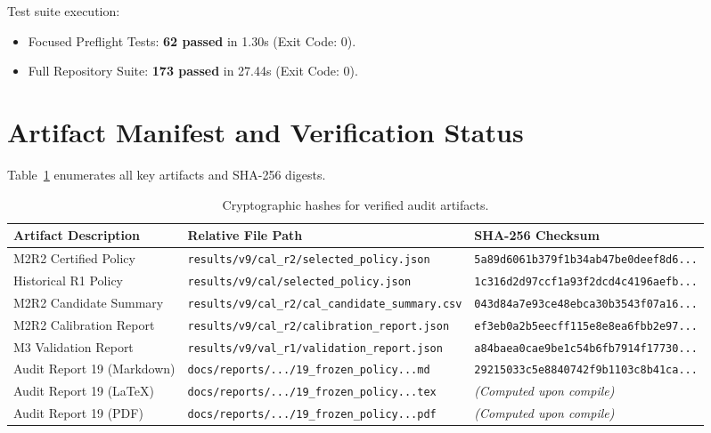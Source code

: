 \documentclass[10pt,a4paper]{article}
\begin{document}
Test suite execution:
\begin{itemize}
    \item Focused Preflight Tests: \textbf{62 passed} in 1.30s (Exit Code: 0).
    \item Full Repository Suite: \textbf{173 passed} in 27.44s (Exit Code: 0).
\end{itemize}

\section{Artifact Manifest and Verification Status}

Table~\ref{tab:manifest} enumerates all key artifacts and SHA-256 digests.

\begin{table}[htbp]
\centering
\small
\begin{tabularx}{\textwidth}{lXl}
\toprule
\textbf{Artifact Description} & \textbf{Relative File Path} & \textbf{SHA-256 Checksum} \\
\midrule
M2R2 Certified Policy & \texttt{results/v9/cal\_r2/selected\_policy.json} & \texttt{5a89d6061b379f1b34ab47be0deef8d6...} \\
Historical R1 Policy & \texttt{results/v9/cal/selected\_policy.json} & \texttt{1c316d2d97ccf1a93f2dcd4c4196aefb...} \\
M2R2 Candidate Summary & \texttt{results/v9/cal\_r2/cal\_candidate\_summary.csv} & \texttt{043d84a7e93ce48ebca30b3543f07a16...} \\
M2R2 Calibration Report & \texttt{results/v9/cal\_r2/calibration\_report.json} & \texttt{ef3eb0a2b5eecff115e8e8ea6fbb2e97...} \\
M3 Validation Report & \texttt{results/v9/val\_r1/validation\_report.json} & \texttt{a84baea0cae9be1c54b6fb7914f17730...} \\
Audit Report 19 (Markdown) & \texttt{docs/reports/.../19\_frozen\_policy...md} & \texttt{29215033c5e8840742f9b1103c8b41ca...} \\
Audit Report 19 (LaTeX) & \texttt{docs/reports/.../19\_frozen\_policy...tex} & \textit{(Computed upon compile)} \\
Audit Report 19 (PDF) & \texttt{docs/reports/.../19\_frozen\_policy...pdf} & \textit{(Computed upon compile)} \\
\bottomrule
\end{tabularx}
\caption{Cryptographic hashes for verified audit artifacts.}
\label{tab:manifest}
\end{table}
\end{document}
